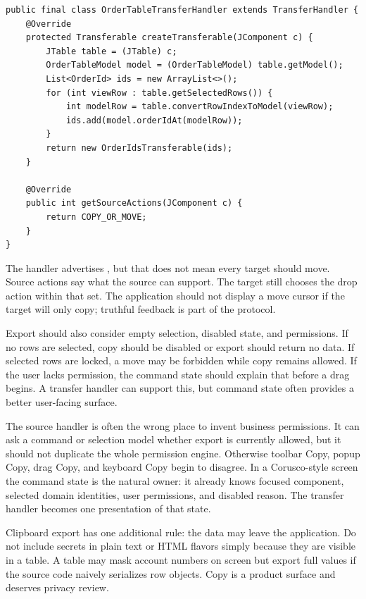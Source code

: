 \begin{lstlisting}[caption={Exporting selected domain IDs from a JTable.}]
public final class OrderTableTransferHandler extends TransferHandler {
    @Override
    protected Transferable createTransferable(JComponent c) {
        JTable table = (JTable) c;
        OrderTableModel model = (OrderTableModel) table.getModel();
        List<OrderId> ids = new ArrayList<>();
        for (int viewRow : table.getSelectedRows()) {
            int modelRow = table.convertRowIndexToModel(viewRow);
            ids.add(model.orderIdAt(modelRow));
        }
        return new OrderIdsTransferable(ids);
    }

    @Override
    public int getSourceActions(JComponent c) {
        return COPY_OR_MOVE;
    }
}
\end{lstlisting}

The handler advertises , but that does not mean every target should move. Source actions say what the source can support. The target still chooses the drop action within that set. The application should not display a move cursor if the target will only copy; truthful feedback is part of the protocol.

Export should also consider empty selection, disabled state, and permissions. If no rows are selected, copy should be disabled or export should return no data. If selected rows are locked, a move may be forbidden while copy remains allowed. If the user lacks permission, the command state should explain that before a drag begins. A transfer handler can support this, but command state often provides a better user-facing surface.

The source handler is often the wrong place to invent business permissions. It can ask a command or selection model whether export is currently allowed, but it should not duplicate the whole permission engine. Otherwise toolbar Copy, popup Copy, drag Copy, and keyboard Copy begin to disagree. In a Corusco-style screen the command state is the natural owner: it already knows focused component, selected domain identities, user permissions, and disabled reason. The transfer handler becomes one presentation of that state.

Clipboard export has one additional rule: the data may leave the application. Do not include secrets in plain text or HTML flavors simply because they are visible in a table. A table may mask account numbers on screen but export full values if the source code naively serializes row objects. Copy is a product surface and deserves privacy review.

